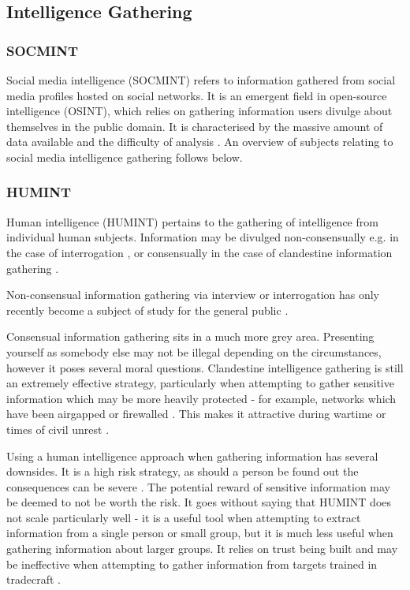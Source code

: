 \documentclass[12pt]{article}
\begin{document}
\subsection{Intelligence Gathering}
\subsubsection{SOCMINT}
Social media intelligence (SOCMINT) refers to information gathered from social media profiles hosted on social networks. It is an emergent field in open-source intelligence (OSINT), which relies on gathering information users divulge about themselves in the public domain. It is characterised by the massive amount of data available \citep{socmintoverview} and the difficulty of analysis \citep{socmintlitreview}. An overview of subjects relating to social media intelligence gathering follows below.

\subsubsection{HUMINT}
Human intelligence (HUMINT) pertains to the gathering of intelligence from individual human subjects. Information may be divulged non-consensually e.g. in the case of interrogation \citep{criminalvshumint}, or consensually in the case of clandestine information gathering \citep{clandestinehumint}. 

Non-consensual information gathering via interview or interrogation has only recently become a subject of study for the general public \citep{humintinterrogators}. 

Consensual information gathering sits in a much more grey area. Presenting yourself as somebody else may not be illegal depending on the circumstances, however it poses several moral questions. Clandestine intelligence gathering is still an extremely effective strategy, particularly when attempting to gather sensitive information which may be more heavily protected - for example, networks which have been airgapped or firewalled \citep{clandestinehumint}. This makes it attractive during wartime or times of civil unrest \citep{humintni}\citep{humintcyberage}.

Using a human intelligence approach when gathering information has several downsides. It is a high risk strategy, as should a person be found out the consequences can be severe \citep{humintni}. The potential reward of sensitive information may be deemed to not be worth the risk. It goes without saying that HUMINT does not scale particularly well - it is a useful tool when attempting to extract information from a single person or small group, but it is much less useful when gathering information about larger groups. It relies on trust being built and may be ineffective when attempting to gather information from targets trained in tradecraft \citep{humintni}\citep{clandestinehumint}\citep{humintcyberage}.
\end{document}
